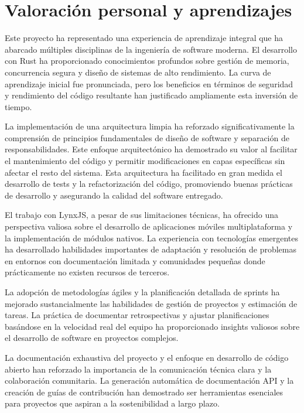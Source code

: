 \section{Valoración personal y aprendizajes}

Este proyecto ha representado una experiencia de aprendizaje integral que ha abarcado múltiples disciplinas de la ingeniería de software moderna. El desarrollo con Rust ha proporcionado conocimientos profundos sobre gestión de memoria, concurrencia segura y diseño de sistemas de alto rendimiento. La curva de aprendizaje inicial fue pronunciada, pero los beneficios en términos de seguridad y rendimiento del código resultante han justificado ampliamente esta inversión de tiempo.

La implementación de una arquitectura limpia ha reforzado significativamente la comprensión de principios fundamentales de diseño de software y separación de responsabilidades. Este enfoque arquitectónico ha demostrado su valor al facilitar el mantenimiento del código y permitir modificaciones en capas específicas sin afectar el resto del sistema.
Esta arquitectura ha facilitado en gran medida el desarrollo de tests y la refactorización del código, promoviendo buenas prácticas de desarrollo y asegurando la calidad del software entregado.

El trabajo con LynxJS, a pesar de sus limitaciones técnicas, ha ofrecido una perspectiva valiosa sobre el desarrollo de aplicaciones móviles multiplataforma y la implementación de módulos nativos. La experiencia con tecnologías emergentes ha desarrollado habilidades importantes de adaptación y resolución de problemas en entornos con documentación limitada y comunidades pequeñas donde prácticamente no existen recursos de terceros.

La adopción de metodologías ágiles y la planificación detallada de sprints ha mejorado sustancialmente las habilidades de gestión de proyectos y estimación de tareas. La práctica de documentar retrospectivas y ajustar planificaciones basándose en la velocidad real del equipo ha proporcionado insights valiosos sobre el desarrollo de software en proyectos complejos.

La documentación exhaustiva del proyecto y el enfoque en desarrollo de código abierto han reforzado la importancia de la comunicación técnica clara y la colaboración comunitaria. La generación automática de documentación API y la creación de guías de contribución han demostrado ser herramientas esenciales para proyectos que aspiran a la sostenibilidad a largo plazo.

